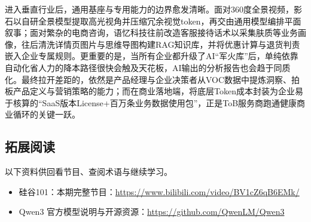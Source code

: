 \documentclass[UTF8,a4paper,11pt,fontset=fandol]{ctexart}
\begin{document}
进入垂直行业后，通用基座与专用能力的边界愈发清晰。面对360度全景视频，影石以自研全景模型提取高光视角并压缩冗余视觉token，再交由通用模型编排平面叙事；面对繁杂的电商咨询，语忆科技往前改造客服接待话术以采集肤质等业务画像，往后清洗详情页图片与思维导图构建RAG知识库，并将优惠计算与退货判责嵌入企业专属规则。更重要的是，当所有企业都升级了AI“军火库”后，单纯依靠自动化省人力的降本路径很快会触及天花板，AI输出的分析报告也会趋于同质化。最终拉开差距的，依然是产品经理与企业决策者从VOC数据中提炼洞察、拍板产品定义与营销策略的能力；而在商业落地端，将底层Token成本封装为企业易于核算的“SaaS版本License+百万条业务数据使用包”，正是ToB服务商跑通健康商业循环的关键一跃。
\subsection{拓展阅读}
以下资料供回看节目、查阅术语与继续学习。
\begin{itemize}
\item 硅谷101：本期完整节目：\url{https://www.bilibili.com/video/BV1cZ6qB6EMk/}
\item Qwen3 官方模型说明与开源资源：\url{https://github.com/QwenLM/Qwen3}
\end{itemize}
\end{document}
